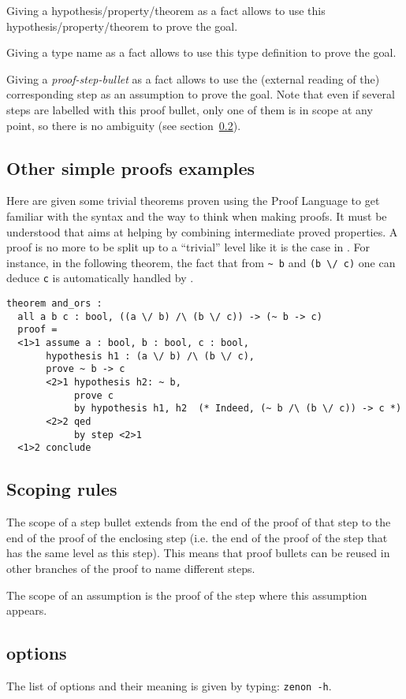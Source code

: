 Giving a hypothesis/property/theorem as a fact allows {\zenon} to use
this hypothesis/property/theorem to prove the goal.

Giving a type name as a fact allows {\zenon} to use this type definition to
prove the goal.

Giving a {\em proof-step-bullet} as a fact allows {\zenon} to use the
(external reading of the) corresponding step as an assumption to prove the
goal. Note that even if several steps are labelled with this proof bullet,
only one of them is in scope at any point, so there is no ambiguity (see
section~\ref{sec:scoping}).


\subsection{Other simple proofs examples}

Here are given some trivial theorems proven using the {\focal} Proof
Language to get familiar with the syntax and the way to think when
making proofs. It must be understood that {\zenon} aims at helping by
combining intermediate proved properties. A proof is no more to be
split up to a ``trivial'' level like it is the case in {\coq}. For
instance, in the following theorem, the fact that from \verb"~ b" and
\verb"(b \/ c)" one can deduce \verb"c" is automatically handled by
{\zenon}.

{\scriptsize
\begin{lstlisting}
theorem and_ors :
  all a b c : bool, ((a \/ b) /\ (b \/ c)) -> (~ b -> c)
  proof =
  <1>1 assume a : bool, b : bool, c : bool,
       hypothesis h1 : (a \/ b) /\ (b \/ c),
       prove ~ b -> c
       <2>1 hypothesis h2: ~ b,
            prove c
            by hypothesis h1, h2  (* Indeed, (~ b /\ (b \/ c)) -> c *)
       <2>2 qed
            by step <2>1
  <1>2 conclude
\end{lstlisting}}

\subsection{Scoping rules}\label{sec:scoping}

The scope of a step bullet extends from the end of the proof of that
step to the end of the proof of the enclosing step (i.e. the end of
the proof of the  step that has the same level as this
step). This means that proof bullets can be reused in other branches
of the proof to name different steps.

The scope of an assumption is the proof of the step where this
assumption appears.

\subsection{{\zenon} options}
\label{zenon-options}
The list of {\zenon} options and their meaning is given by typing:
{\tt zenon -h}.
